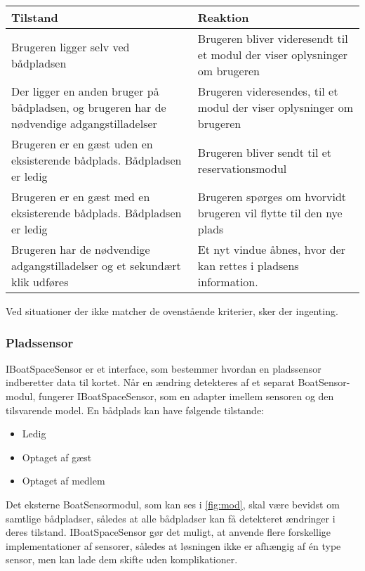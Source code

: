 \begin{tabu} to \textwidth {XX}
  \toprule
  \textbf{Tilstand} & \textbf{Reaktion} \\
   \midrule
   Brugeren ligger selv ved bådpladsen & Brugeren bliver videresendt til et modul der viser oplysninger om brugeren \\
   \midrule
  Der ligger en anden bruger på bådpladsen, og brugeren har de nødvendige adgangstilladelser & Brugeren videresendes, til et modul der viser oplysninger om brugeren \\
  \midrule
   Brugeren er en gæst uden en eksisterende bådplads. Bådpladsen er ledig & Brugeren bliver sendt til et reservationsmodul \\ 
   \midrule
   Brugeren er en gæst med en eksisterende bådplads. Bådpladsen er ledig & Brugeren spørges om hvorvidt brugeren vil flytte til den nye plads \\
   \midrule
   Brugeren har de nødvendige adgangstilladelser og et sekundært klik udføres & Et nyt vindue åbnes, hvor der kan rettes i pladsens information. \\
   \bottomrule 
\end{tabu}
Ved situationer der ikke matcher de ovenstående kriterier, sker der ingenting.


\subsubsection{Pladssensor}
\label{sub:map_sensor_interface}

IBoatSpaceSensor er et interface, som bestemmer hvordan en pladssensor indberetter data til kortet. Når en ændring detekteres af et separat BoatSensor-modul, fungerer IBoatSpaceSensor, som en adapter imellem sensoren og den tilsvarende model. En bådplads kan have følgende tilstande:

\begin{itemize}
  \item Ledig
  \item Optaget af gæst
  \item Optaget af medlem
\end{itemize}

Det eksterne BoatSensormodul, som kan ses i \cref{fig:mod}, skal være bevidst om samtlige bådpladser, således at alle bådpladser kan få detekteret ændringer i deres tilstand. IBoatSpaceSensor gør det muligt, at anvende flere forskellige implementationer af sensorer, således at løsningen ikke er afhængig af én type sensor, men kan lade dem skifte uden komplikationer.



